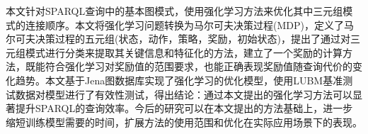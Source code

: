 \begin{conclusions}

本文针对SPARQL查询中的基本图模式，使用强化学习方法来优化其中三元组模式的连接顺序。本文将强化学习问题转换为马尔可夫决策过程(MDP)，定义了马尔可夫决策过程的五元组(状态，动作，策略，奖励，初始状态)，提出了通过对三元组模式进行分类来提取其关键信息和特征化的方法，建立了一个奖励的计算方法，既能符合强化学习对奖励值的范围要求，也能正确表现奖励值随查询代价的变化趋势。本文基于Jena图数据库实现了强化学习的优化模型，使用LUBM基准测试数据对模型进行了有效性测试，得出结论：通过本文提出的强化学习方法可以显著提升SPARQL的查询效率。今后的研究可以在本文提出的方法基础上，进一步缩短训练模型需要的时间，扩展方法的使用范围和优化在实际应用场景下的表现。

\end{conclusions}

